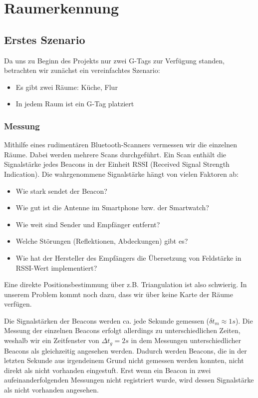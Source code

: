 \section{Raumerkennung}

\subsection{Erstes Szenario}

Da uns zu Beginn des Projekts nur zwei G-Tags zur Verfügung standen, betrachten
wir zunächst ein vereinfachtes Szenario:
\begin{itemize}
	\item Es gibt zwei Räume: Küche, Flur
	\item In jedem Raum ist ein G-Tag platziert
\end{itemize}

\subsubsection{Messung}

Mithilfe eines rudimentären Bluetooth-Scanners vermessen wir die einzelnen Räume.
Dabei werden mehrere Scans durchgeführt. Ein Scan enthält die Signalstärke 
jedes Beacons in der Einheit RSSI (Received Signal Strength Indication).
Die wahrgenommene Signalstärke hängt von vielen Faktoren ab:
\begin{itemize}
	\item Wie stark sendet der Beacon?
	\item Wie gut ist die Antenne im Smartphone bzw. der Smartwatch?
	\item Wie weit sind Sender und Empfänger entfernt?
	\item Welche Störungen (Reflektionen, Abdeckungen) gibt es?
	\item Wie hat der Hersteller des Empfängers die Übersetzung von Feldstärke in RSSI-Wert implementiert?
\end{itemize}
Eine direkte Positionsbestimmung über z.B. Triangulation ist also schwierig.
In unserem Problem kommt noch dazu, dass wir über keine Karte der Räume
verfügen.

Die Signalstärken der Beacons werden ca. jede Sekunde gemessen ($\delta t_m \approx 1s$).
Die Messung der einzelnen Beacons erfolgt allerdings zu unterschiedlichen Zeiten,
weshalb wir ein Zeitfenster von $\Delta t_g = 2s$ in dem Messungen unterschiedlicher
Beacons als gleichzeitig angesehen werden. Dadurch werden Beacons, die in der letzten Sekunde aus irgendeinem Grund nicht gemessen werden konnten, nicht direkt als nicht vorhanden eingestuft.
Erst wenn ein Beacon in zwei aufeinanderfolgenden Messungen nicht registriert wurde, wird dessen Signalstärke als nicht vorhanden angesehen.

